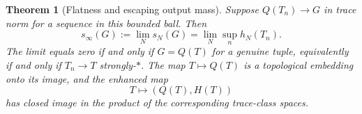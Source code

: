 \documentclass[11pt,a4paper]{amsart}
\numberwithin{equation}{section}
\newtheorem{theorem}{Theorem}[section]
\theoremstyle{definition}
\theoremstyle{remark}
\begin{document}
\begin{theorem}[Flatness and escaping output mass]\label{thm:strongclosure}
Suppose $Q(T_n)\to G$ in trace norm for a sequence in this bounded ball. Then
\begin{equation}\label{eq:escapemass}
 s_\infty(G):=\lim_Ns_N(G)=\lim_N\sup_nh_N(T_n).
\end{equation}
The limit equals zero if and only if $G=Q(T)$ for a genuine tuple, equivalently if and only if $T_n\to T$ strongly-$*$. The map $T\mapsto Q(T)$ is a topological embedding onto its image, and the enhanced map
\begin{equation}\label{eq:closedstrongcode}
 T\longmapsto(Q(T),H(T))
\end{equation}
has closed image in the product of the corresponding trace-class spaces.
\end{theorem}
\end{document}
